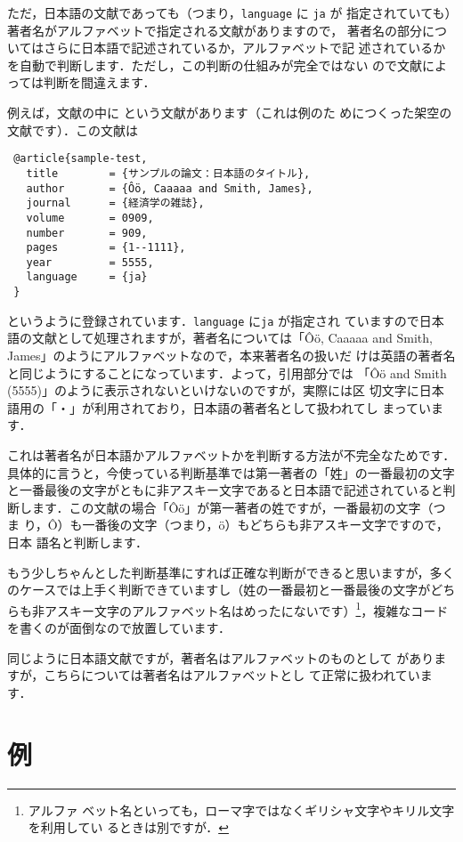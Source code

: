 \documentclass[article]{jlreq}
\begin{document}
ただ，日本語の文献であっても（つまり，\texttt{language} に \texttt{ja} が
指定されていても）著者名がアルファベットで指定される文献がありますので，
著者名の部分についてはさらに日本語で記述されているか，アルファベットで記
述されているかを自動で判断します．ただし，この判断の仕組みが完全ではない
ので文献によっては判断を間違えます．

例えば，文献の中に \citet{sample-test} という文献があります（これは例のた
めにつくった架空の文献です）．この文献は
\begin{verbatim}
 @article{sample-test,
   title        = {サンプルの論文：日本語のタイトル},
   author       = {Ôö, Caaaaa and Smith, James},
   journal      = {経済学の雑誌},
   volume       = 0909,
   number       = 909,
   pages        = {1--1111},
   year         = 5555,
   language     = {ja}
 }
\end{verbatim}
というように登録されています．\texttt{language} に\texttt{ja} が指定され
ていますので日本語の文献として処理されますが，著者名については「Ôö,
Caaaaa and Smith, James」のようにアルファベットなので，本来著者名の扱いだ
けは英語の著者名と同じようにすることになっています．よって，引用部分では
「Ôö and Smith (5555)」のように表示されないといけないのですが，実際には区
切文字に日本語用の「・」が利用されており，日本語の著者名として扱われてし
まっています．

これは著者名が日本語かアルファベットかを判断する方法が不完全なためです．
具体的に言うと，今使っている判断基準では第一著者の「姓」の一番最初の文字
と一番最後の文字がともに非アスキー文字であると日本語で記述されていると判
断します．この文献の場合「Ôö」が第一著者の姓ですが，一番最初の文字（つま
り，Ô）も一番後の文字（つまり，ö）もどちらも非アスキー文字ですので，日本
語名と判断します．

もう少しちゃんとした判断基準にすれば正確な判断ができると思いますが，多く
のケースでは上手く判断できていますし（姓の一番最初と一番最後の文字がどち
らも非アスキー文字のアルファベット名はめったにないです）\footnote{アルファ
ベット名といっても，ローマ字ではなくギリシャ文字やキリル文字を利用してい
るときは別ですが．}，複雑なコードを書くのが面倒なので放置しています．

同じように日本語文献ですが，著者名はアルファベットのものとして
\citet{Ryza2016} がありますが，こちらについては著者名はアルファベットとし
て正常に扱われています．

\section{例}
\end{document}
